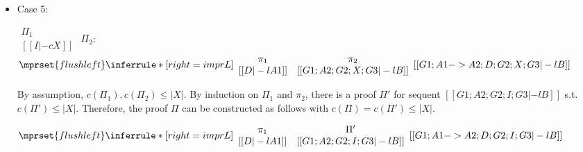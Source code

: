 \begin{itemize}
\item Case 5:
      \begin{center}
        \scriptsize
        \begin{math}
          \begin{array}{c}
            \Pi_1 \\
            {[[I |-c X]]}
          \end{array}
        \end{math}
        \qquad\qquad
        $\Pi_2$:
        \begin{math}
          $$\mprset{flushleft}
          \inferrule* [right={\tiny imprL}] {
            {
              \begin{array}{cc}
                \pi_1 & \pi_2 \\
                {[[D |-l A1]]} & {[[G1; A2; G2; X; G3 |-l B]]}
              \end{array}
            }
          }{[[G1; A1 -> A2; D; G2; X; G3 |-l B]]}
        \end{math}
      \end{center}
      By assumption, $c(\Pi_1),c(\Pi_2)\leq |X|$. By induction on $\Pi_1$
      and $\pi_2$, there is a proof $\Pi'$ for sequent
      $[[G1; A2; G2; I; G3 |-l B]]$ s.t. $c(\Pi') \leq |X|$. Therefore, the
      proof $\Pi$ can be constructed as follows with
      $c(\Pi) = c(\Pi') \leq |X|$.
      \begin{center}
        \scriptsize
        \begin{math}
          $$\mprset{flushleft}
          \inferrule* [right={\tiny imprL}] {
            {
              \begin{array}{cc}
                \pi_1 & \Pi' \\
                {[[D |-l A1]]} & {[[G1; A2; G2; I; G3 |-l B]]}
              \end{array}
            }
          }{[[G1; A1 -> A2; D; G2; I; G3 |-l B]]}
        \end{math}
      \end{center}


\end{itemize}
